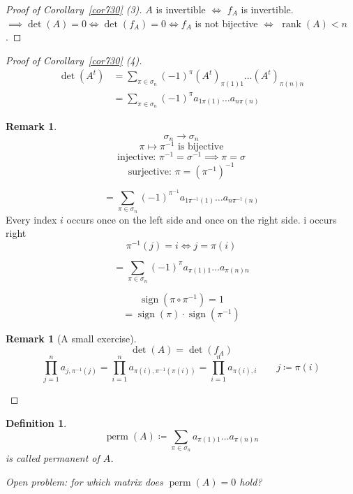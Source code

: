 \documentclass{article}
\newcounter{lecref}[section]
\numberwithin{lecref}{section}
\newtheorem{definition}[lecref]{Definition}
\newtheorem{remark}[lecref]{Remark}
\DeclareMathOperator{\perm}{perm}
\DeclareMathOperator{\sign}{sign}
\begin{document}
\begin{proof}[Proof of Corollary~\ref{cor730} (3)]
  $A$ is invertible $\iff$ $f_A$ is invertible.
  $\implies \det(A) = 0 \iff \det(f_A) = 0 \iff f_A$ is not bijective $\iff$ $\operatorname{rank}(A) < n$.
\end{proof}

\begin{proof}[Proof of Corollary~\ref{cor730} (4)]
  \begin{align*}
    \det(A^t) &= \sum_{\pi \in \sigma_n} (-1)^\pi (A^t)_{\pi(1) 1} \dots (A^t)_{\pi(n) n} \\
      &= \sum_{\pi \in \sigma_n} (-1)^\pi a_{1 \pi(1)} \dots a_{n \pi(n)}
  \end{align*}

  \begin{remark}
    \[ \sigma_n \to \sigma_n \]
    \[ \pi \mapsto \pi^{-1} \text{ is bijective} \]
    \[ \text{injective: } \pi^{-1} = \sigma^{-1} \implies \pi = \sigma \]
    \[ \text{surjective: } \pi = (\pi^{-1})^{-1} \]
  \end{remark}

  \[ = \sum_{\pi \in \sigma_n} (-1)^{\pi^{-1}} a_{1 \pi^{-1}(1)} \dots a_{n \pi^{-1}(n)} \]
  Every index $i$ occurs once on the left side and once on the right side. i occurs right
  \[ \pi^{-1}(j) = i  \iff  j = \pi(i) \]

  \[ = \sum_{\pi \in \sigma_n} (-1)^\pi a_{\pi(1) 1} \dots a_{\pi(n) n} \]

  \[ \sign(\pi \circ \pi^{-1}) = 1 \]
  \[ = \sign(\pi) \cdot \sign(\pi^{-1}) \]

  \begin{remark}[A small exercise]
    \[ \det(A) = \det(f_A) \]
    \[
      \prod_{j=1}^n a_{j, \pi^{-1}(j)}
      = \prod_{i=1}^n a_{\pi(i), \pi^{-1}(\pi(i))}
      = \prod_{i=1}^n a_{\pi(i), i}
      \qquad j \coloneqq \pi(i)
    \]
  \end{remark}
\end{proof}

\begin{definition}
  \[ \perm(A) \coloneqq \sum_{\pi \in \sigma_n} a_{\pi(1) 1} \dots a_{\pi(n) n} \]
  is called \emph{permanent of $A$}.

  Open problem: for which matrix does $\perm(A) = 0$ hold?
\end{definition}
\end{document}

